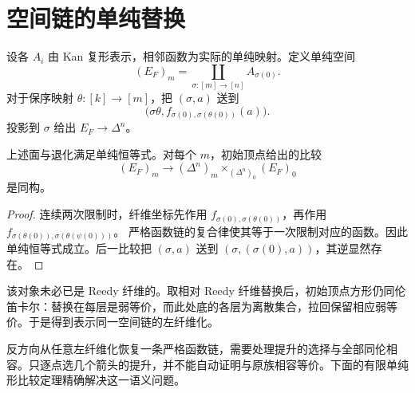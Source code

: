 \section{空间链的单纯替换}
\begin{definition}[严格函数链的单纯替换]
设各 $A_i$ 由 Kan 复形表示，相邻函数为实际的单纯映射。定义单纯空间
\[
(E_F)_m=\coprod_{\sigma:[m]\to[n]}A_{\sigma(0)}.
\]
对于保序映射 $\theta:[k]\to[m]$，把 $(\sigma,a)$ 送到
\[
\bigl(\sigma\theta,
 f_{\sigma(0),\sigma(\theta(0))}(a)\bigr).
\]
投影到 $\sigma$ 给出 $E_F\to\Delta^n$。
\end{definition}
\begin{proposition}
上述面与退化满足单纯恒等式。对每个 $m$，初始顶点给出的比较
\[
(E_F)_m\longrightarrow
(\Delta^n)_m\times_{(\Delta^n)_0}(E_F)_0
\]
是同构。
\end{proposition}
\begin{proof}
连续两次限制时，纤维坐标先作用
$f_{\sigma(0),\sigma(\theta(0))}$，再作用
$f_{\sigma(\theta(0)),\sigma(\theta(\psi(0)))}$。
严格函数链的复合律使其等于一次限制对应的函数。因此单纯恒等式成立。后一比较把 $(\sigma,a)$ 送到 $(\sigma,(\sigma(0),a))$，其逆显然存在。
\end{proof}
\begin{remark}
该对象未必已是 Reedy 纤维的。取相对 Reedy 纤维替换后，初始顶点方形仍同伦笛卡尔：替换在每层是弱等价，而此处底的各层为离散集合，拉回保留相应弱等价。于是得到表示同一空间链的左纤维化。
\end{remark}
\begin{remark}
反方向从任意左纤维化恢复一条严格函数链，需要处理提升的选择与全部同伦相容。只逐点选几个箭头的提升，并不能自动证明与原族相容等价。下面的有限单纯形比较定理精确解决这一语义问题。
\end{remark}

